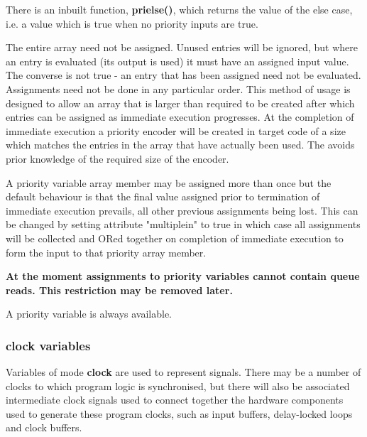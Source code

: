                 There is an inbuilt function, {\bf prielse()}, which returns
                the value of the else case, i.e. a value which is true when
                no priority inputs are true.

                The entire array need not be assigned. Unused entries will be
                ignored, but where an entry is evaluated (its output is used)
                it must have an assigned input value. The converse is not
                true - an entry that has been assigned need not be evaluated.
                Assignments need not be done in any particular order. This method
                of usage is designed to allow an array that is larger than
                required to be created after which entries can be
                assigned as immediate execution progresses. At the completion of
                immediate execution a priority encoder will be created in target
                code of a size which matches the entries in the array that have
                actually been used. The avoids prior knowledge of the required
                size of the encoder.
        
                A priority variable array member may be assigned more than once
                but the default behaviour is that the final value assigned prior
                to termination of immediate execution prevails, all other
                previous assignments being lost. This can be changed by setting
                attribute "multiplein" to true in which case all assignments
                will be collected and ORed together on completion of immediate
                execution to form the input to that priority array member.

                {\bf At the moment assignments to priority variables cannot
                contain queue reads. This restriction may be removed later.}

                A priority variable is always available.

            \subsubsection{clock variables}
            
                Variables of mode {\bf clock} are used to represent signals.
                There may be a number of clocks to which program logic is
                synchronised, but there will also be associated intermediate
                clock signals used to connect together the hardware components
                used to generate these program clocks, such as input buffers,
                delay-locked loops and clock buffers.


